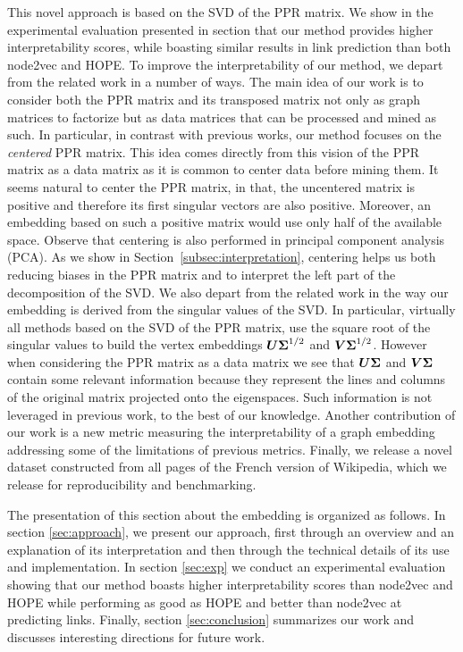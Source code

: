 This novel approach is based on the SVD of the PPR matrix. We show in the experimental evaluation presented in section  that our method provides higher interpretability scores, while boasting similar results in link prediction than both node2vec and HOPE. To improve the interpretability of our method, we depart from the related work in a number of ways. The main idea of our work is to consider both the PPR matrix and its transposed matrix not only as graph matrices to factorize but as data matrices that can be processed and mined as such. In particular, in contrast with previous works, our method focuses on the \textit{centered} PPR matrix. This idea comes directly from this vision of the PPR matrix as a data matrix as it is common to center data before mining them. It seems natural to center the PPR matrix, in that, the uncentered matrix is positive and therefore its first singular vectors are also positive. Moreover, an embedding based on such a positive matrix would use only half of the available space. Observe that centering is also performed in principal component analysis (PCA). As we show in Section~\ref{subsec:interpretation}, centering helps us both reducing biases in the PPR matrix and to interpret the left part of the decomposition of the SVD. We also depart from the related work in the way our embedding is derived from the singular values of the SVD. In particular, virtually all methods based on the SVD of the PPR matrix, use the square root of the singular values to build the vertex embeddings $\boldsymbol{U}\boldsymbol{\Sigma}^{1/2}$ and $\boldsymbol{V}\boldsymbol{\Sigma}^{1/2}$. However when considering the PPR matrix as a data matrix we see that $\boldsymbol{U}\boldsymbol{\Sigma}$ and $\boldsymbol{V}\boldsymbol{\Sigma}$ contain some relevant information because they represent the lines and columns of the original matrix projected onto the eigenspaces. Such information is not leveraged in previous work, to the best of our knowledge.  Another contribution of our work is a new metric measuring the interpretability of a graph embedding addressing some of the limitations of previous metrics. Finally, we release a novel dataset constructed from all pages of the French version of Wikipedia, which we release for reproducibility and benchmarking.

The presentation of this section about the \parfaite embedding is organized as follows. In section \ref{sec:approach}, we present our approach, first through an overview and an explanation of its interpretation and then through the technical details of its use and implementation. 
In section \ref{sec:exp} we conduct an experimental evaluation showing that our method boasts higher interpretability scores than node2vec and HOPE while performing as good as HOPE and better than node2vec at predicting links.
Finally, section \ref{sec:conclusion} summarizes our work and discusses interesting directions for future work.


